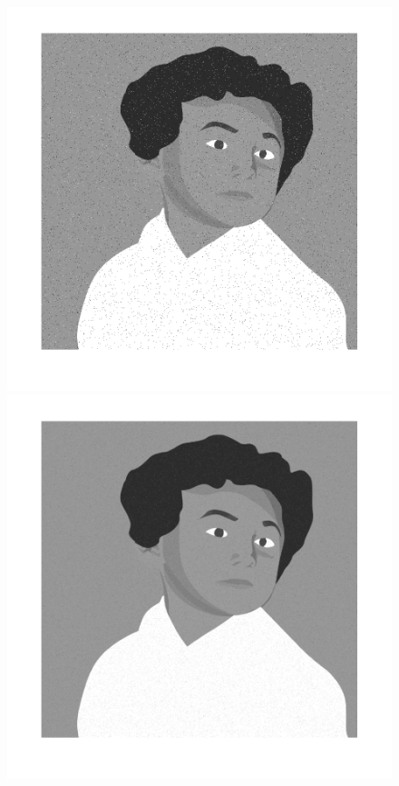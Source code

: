 \begin{figure}[htb] \centering
\includegraphics[scale=0.25]{Pictures/Esempi di utilizzo/Esempio 2/raffo_originale.png}
\includegraphics[scale=0.25]{Pictures/Esempi di utilizzo/Esempio 2/raffo_filtrata_n_iter10.png}

\end{figure}
